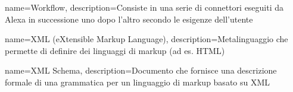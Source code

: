 {
	name={Workflow},
	description={Consiste in una serie di connettori eseguiti da Alexa in successione uno dopo l'altro secondo le esigenze dell'utente}
	{\newpage}
}

{
	name={XML (eXtensible Markup Language)},
	description={Metalinguaggio che permette di definire dei linguaggi di markup (ad es. HTML)}
}

{
	name={XML Schema},
	description={Documento che fornisce una descrizione formale di una grammatica per un linguaggio di markup basato su XML}
}